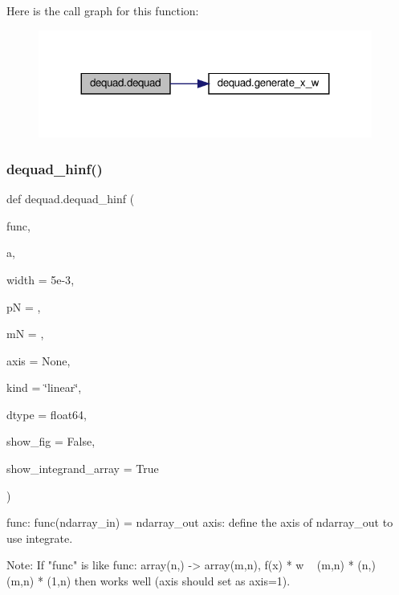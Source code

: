 Here is the call graph for this function\+:\nopagebreak
\begin{figure}[H]
\begin{center}
\leavevmode
\includegraphics[width=311pt]{da/dfc/namespacedequad_a312cb2f278bec2760a7cb9a17bf3928f_cgraph}
\end{center}
\end{figure}
\mbox{\label{namespacedequad_a2654bb61f33ab8685320882396c81ae0}} 
\subsubsection{\texorpdfstring{dequad\+\_\+hinf()}{dequad\_hinf()}}
{\footnotesize\ttfamily def dequad.\+dequad\+\_\+hinf (\begin{DoxyParamCaption}\item[{}]{func,  }\item[{}]{a,  }\item[{}]{width = {\ttfamily 5e-\/3},  }\item[{}]{pN = {},  }\item[{}]{mN = {},  }\item[{}]{axis = {\ttfamily None},  }\item[{}]{kind = {\ttfamily \char`\"{}linear\char`\"{}},  }\item[{}]{dtype = {\ttfamily float64},  }\item[{}]{show\+\_\+fig = {\ttfamily False},  }\item[{}]{show\+\_\+integrand\+\_\+array = {\ttfamily True} }\end{DoxyParamCaption})}

\begin{DoxyVerb}func: func(ndarray_in) = ndarray_out
axis: define the axis of ndarray_out to use integrate.

Note: If "func" is like func: array(n,) -> array(m,n),
          f(x) * w ~ (m,n) * (n,) ~ (m,n) * (1,n)
      then works well (axis should set as axis=1). 
\end{DoxyVerb}
 

